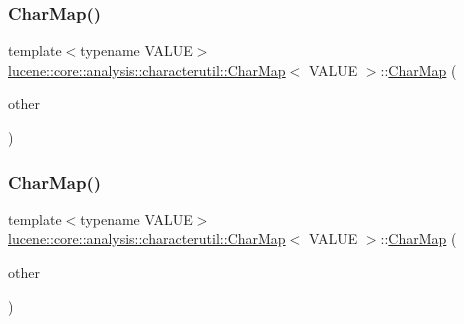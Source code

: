 \mbox{\label{classlucene_1_1core_1_1analysis_1_1characterutil_1_1CharMap_a0698d6cda30fd0a977a59ada5486f0b8}} 
\subsubsection{\texorpdfstring{Char\+Map()}{CharMap()}\hspace{0.1cm}{\footnotesize\ttfamily [4/5]}}
{\footnotesize\ttfamily template$<$typename V\+A\+L\+UE$>$ \\
\mbox{\hyperlink{classlucene_1_1core_1_1analysis_1_1characterutil_1_1CharMap}{lucene\+::core\+::analysis\+::characterutil\+::\+Char\+Map}}$<$ V\+A\+L\+UE $>$\+::\mbox{\hyperlink{classlucene_1_1core_1_1analysis_1_1characterutil_1_1CharMap}{Char\+Map}} (\begin{DoxyParamCaption}\item[{const \mbox{\hyperlink{classlucene_1_1core_1_1analysis_1_1characterutil_1_1CharMap}{Char\+Map}}$<$ V\+A\+L\+UE $>$ \&}]{other }\end{DoxyParamCaption})\hspace{0.3cm}{\ttfamily [inline]}}

\mbox{\label{classlucene_1_1core_1_1analysis_1_1characterutil_1_1CharMap_aa83b5c7a819e10d002d8d06bc6ad45a0}} 
\subsubsection{\texorpdfstring{Char\+Map()}{CharMap()}\hspace{0.1cm}{\footnotesize\ttfamily [5/5]}}
{\footnotesize\ttfamily template$<$typename V\+A\+L\+UE$>$ \\
\mbox{\hyperlink{classlucene_1_1core_1_1analysis_1_1characterutil_1_1CharMap}{lucene\+::core\+::analysis\+::characterutil\+::\+Char\+Map}}$<$ V\+A\+L\+UE $>$\+::\mbox{\hyperlink{classlucene_1_1core_1_1analysis_1_1characterutil_1_1CharMap}{Char\+Map}} (\begin{DoxyParamCaption}\item[{const \mbox{\hyperlink{classlucene_1_1core_1_1analysis_1_1characterutil_1_1CharMap}{Char\+Map}}$<$ V\+A\+L\+UE $>$ \&\&}]{other }\end{DoxyParamCaption})\hspace{0.3cm}{\ttfamily [inline]}}

